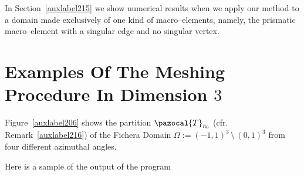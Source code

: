 In Section~\ref{auxlabel215} we show numerical results when we
apply our method to a domain made exclusively of one kind of macro--elements,
namely, the prismatic macro--element with a singular edge and no singular vertex.

\section{Examples Of The Meshing Procedure In Dimension $3$} %
\label{auxlabel214}
Figure~\ref{auxlabel206} shows the partition $\pazocal{T}_{\textit{h}_0}$ (cfr. Remark~\ref{auxlabel216}) of the Fichera Domain 
$\Omega:=(-1,1)^3\,\setminus\,(0,1)^3$ from four different azimuthal 
angles. 

\tauZero 

\newpage
Here is a sample of the output of the program

